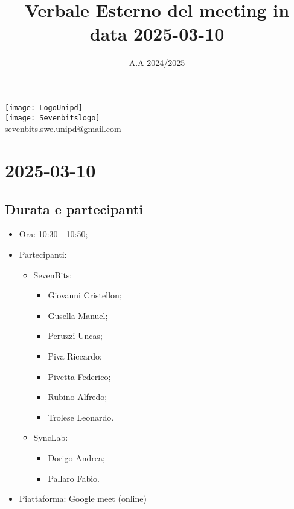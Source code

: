 \documentclass[10pt]{article}
\title{Verbale Esterno del meeting in data 2025-03-10} %
\date{A.A 2024/2025}
\begin{document}
\maketitle
\center 
\texttt{[image: LogoUnipd]}\\
\texttt{[image: Sevenbitslogo]}\\
sevenbits.swe.unipd@gmail.com\\
\vspace{2mm}

\newpage
\raggedright
\tableofcontents

\newpage
\section{2025-03-10} %
\subsection{Durata e partecipanti}
\begin{itemize}
\item Ora: 10:30 - 10:50; %
\item Partecipanti: 	
	\begin{itemize}
        \item SevenBits:
        \begin{itemize}
            \item Giovanni Cristellon;
            \item Gusella Manuel;
            \item Peruzzi Uncas;
            \item Piva Riccardo;
            \item Pivetta Federico;
            \item Rubino Alfredo;
            \item Trolese Leonardo.
        \end{itemize}
            \item SyncLab:
            \begin{itemize}
                \item Dorigo Andrea;
                \item Pallaro Fabio.
	    \end{itemize}
	\end{itemize}
\item Piattaforma: Google meet (online)
\end{itemize}
\end{document}
